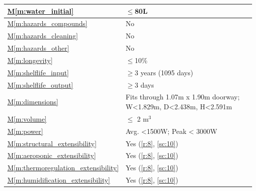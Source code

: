 \documentclass{../tex/report}
\newcommand{\mref}[1]{\hyperref[#1]{M\ref{#1}}}
\begin{document}
\begin{tabular}{|l|p{14.35cm}|}
    \mref{m:water_initial}              & $\le$80L                                                          \hfill \cite{dsfc-phase2}                               \\ \hline
    \mref{m:hazards_compounds} & No \hfill \cite{dsfc-phase2} \\ \hline
    \mref{m:hazards_cleaning} & No \hfill \cite{dsfc-phase2} \\ \hline
    \mref{m:hazards_other} & No \hfill \cite{dsfc-phase2} \\ \hline
    \mref{m:longevity}                  & $\le$10\%                                                         \hfill \cite{applicantguide,dsfc-phase2}                \\ \hline
    \mref{m:shelflife_input}            & $\ge$3 years (1095 days)                                          \hfill \cite{applicantguide,dsfc-phase2}                \\ \hline
    \mref{m:shelflife_output}           & $\ge$3 days                                                       \hfill \cite{dsfc-phase2}                               \\ \hline
    \mref{m:dimensions}                 & Fits through 1.07m x 1.90m doorway; W<1.829m, D<2.438m, H<2.591m  \hfill \cite{applicantguide,dsfc-phase2}                \\ \hline
    \mref{m:volume}                     & $\le$ 2 m${}^3$                                                   \hfill \cite{applicantguide,dsfc-phase2}                \\ \hline
    \mref{m:power}                      & Avg. <1500W; Peak < 3000W                                         \hfill \cite{applicantguide,dsfc-phase2}                \\ \hline
    \mref{m:structural_extensibility}   & Yes                                                               \hfill (\ref{r:8}, \ref{sc:10})                         \\ \hline
    \mref{m:aeroponic_extensibility}        & Yes                                                               \hfill (\ref{r:8}, \ref{sc:10})                         \\ \hline
    \mref{m:thermoregulation_extensibility} & Yes                                                               \hfill (\ref{r:8}, \ref{sc:10})                         \\ \hline
    \mref{m:humidification_extensibility}   & Yes                                                               \hfill (\ref{r:8}, \ref{sc:10})                         \\ \hline

\end{tabular}
\end{document}
